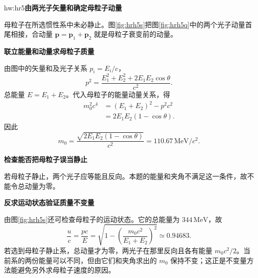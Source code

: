 \begin{drillsolution}{hw:hr5}\textbf{由两光子矢量和确定母粒子动量}\par\nobreak
母粒子在所选惯性系中未必静止。图\ref{fig:hrh5s}把图\ref{fig:hrh5q}中的两个光子动量首尾相接，合动量 $\bm p=\bm p_1+\bm p_2$ 就是母粒子衰变前的动量。



\par\medskip{}\noindent\textbf{联立能量和动量求母粒子质量}\par\nobreak
由图中的矢量和及光子关系 $p_i=E_i/c$，
\[
p^2=\frac{E_1^2+E_2^2+2E_1E_2\cos\theta}{c^2}.
\]
总能量 $E=E_1+E_2$。代入母粒子的能量动量关系，得
\begin{align*}
m_0^2c^4&=(E_1+E_2)^2-p^2c^2\\
 &=2E_1E_2(1-\cos\theta).
\end{align*}
因此
\[
\boxed{m_0=\frac{\sqrt{2E_1E_2(1-\cos\theta)}}{c^2}
 =110.67\,\mathrm{MeV}/c^2}.
\]


\par\medskip{}\noindent\textbf{检查能否把母粒子误当静止}\par\nobreak
若母粒子静止，两个光子应等能且反向。本题的能量和夹角不满足这一条件，故不能令总动量为零。



\par\medskip{}\noindent\textbf{反求运动状态验证质量不变量}\par\nobreak
由图\ref{fig:hrh5s}还可检查母粒子的运动状态。它的总能量为 $344\,\mathrm{MeV}$，故
\[
\frac{u}{c}=\frac{pc}{E}
=\sqrt{1-\left(\frac{m_0c^2}{E_1+E_2}\right)^2}
\simeq0.94683.
\]
若选到母粒子静止系，总动量才为零，两光子在那里反向且各有能量 $m_0c^2/2$。当前系的两份能量可以不同，但由它们和夹角求出的 $m_0$ 保持不变；这正是不变量方法能避免另外求母粒子速度的原因。

\end{drillsolution}

